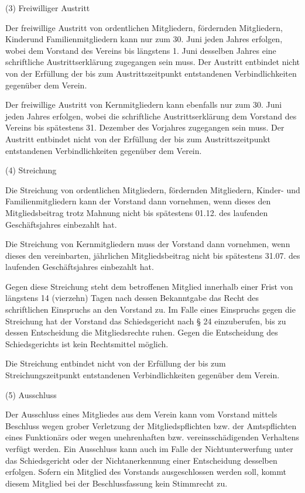 \documentclass[11pt,a4paper]{article}
\begin{document}
(3)
Freiwilliger Austritt

Der freiwillige Austritt von ordentlichen Mitgliedern, fördernden Mitgliedern, Kinderund Familienmitgliedern kann nur zum 30. Juni jeden Jahres erfolgen, wobei dem Vorstand des Vereins bis längstens 1. Juni desselben Jahres eine schriftliche Austrittserklärung zugegangen sein muss.
Der Austritt entbindet nicht von der Erfüllung der bis zum Austrittszeitpunkt entstandenen Verbindlichkeiten gegenüber dem Verein.

Der freiwillige Austritt von Kernmitgliedern kann ebenfalls nur zum 30. Juni jeden Jahres erfolgen, wobei die schriftliche Austrittserklärung dem Vorstand des Vereins bis spätestens 31. Dezember des Vorjahres zugegangen sein muss.
Der Austritt entbindet nicht von der Erfüllung der bis zum Austrittszeitpunkt entstandenen Verbindlichkeiten gegenüber dem Verein.

(4)
Streichung

Die Streichung von ordentlichen Mitgliedern, fördernden Mitgliedern, Kinder- und Familienmitgliedern kann der Vorstand dann vornehmen, wenn dieses den Mitgliedsbeitrag trotz Mahnung nicht bis spätestens 01.12. des laufenden Geschäftsjahres einbezahlt hat.

Die Streichung von Kernmitgliedern muss der Vorstand dann vornehmen, wenn dieses den vereinbarten, jährlichen Mitgliedsbeitrag nicht bis spätestens 31.07. des laufenden Geschäftsjahres einbezahlt hat.

Gegen diese Streichung steht dem betroffenen Mitglied innerhalb einer Frist von längstens 14 (vierzehn) Tagen nach dessen Bekanntgabe das Recht des schriftlichen Einspruchs an den Vorstand zu.
Im Falle eines Einspruchs gegen die Streichung hat der Vorstand das Schiedsgericht nach § 24 einzuberufen, bis zu dessen Entscheidung die Mitgliedsrechte ruhen.
Gegen die Entscheidung des Schiedsgerichts ist kein Rechtsmittel möglich.

Die Streichung entbindet nicht von der Erfüllung der bis zum Streichungszeitpunkt entstandenen Verbindlichkeiten gegenüber dem Verein.

(5)
Ausschluss

Der Ausschluss eines Mitgliedes aus dem Verein kann vom Vorstand mittels Beschluss wegen grober Verletzung der Mitgliedspflichten bzw. der Amtspflichten eines Funktionärs oder wegen unehrenhaften bzw. vereinsschädigenden Verhaltens verfügt werden.
Ein Ausschluss kann auch im Falle der Nichtunterwerfung unter das Schiedsgericht oder der Nichtanerkennung einer Entscheidung desselben erfolgen.
Sofern ein Mitglied des Vorstands ausgeschlossen werden soll, kommt diesem Mitglied bei der Beschlussfassung kein Stimmrecht zu.
\end{document}
